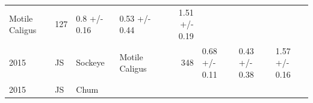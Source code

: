\documentclass[fleqn,10pt]{wlpeerj} %
\begin{document}
\begin{longtable}[]{@{}llllrlll@{}}
\begin{minipage}[t]{0.11\columnwidth}
Motile Caligus\strut
\end{minipage} & \begin{minipage}[t]{0.04\columnwidth}\raggedleft\strut
127\strut
\end{minipage} & \begin{minipage}[t]{0.14\columnwidth}\raggedright\strut
0.8 +/- 0.16\strut
\end{minipage} & \begin{minipage}[t]{0.14\columnwidth}\raggedright\strut
0.53 +/- 0.44\strut
\end{minipage} & \begin{minipage}[t]{0.14\columnwidth}\raggedright\strut
1.51 +/- 0.19\strut
\end{minipage}\tabularnewline
\begin{minipage}[t]{0.09\columnwidth}\raggedright\strut
2015\strut
\end{minipage} & \begin{minipage}[t]{0.06\columnwidth}\raggedright\strut
JS\strut
\end{minipage} & \begin{minipage}[t]{0.06\columnwidth}\raggedright\strut
Sockeye\strut
\end{minipage} & \begin{minipage}[t]{0.11\columnwidth}\raggedright\strut
Motile Caligus\strut
\end{minipage} & \begin{minipage}[t]{0.04\columnwidth}\raggedleft\strut
348\strut
\end{minipage} & \begin{minipage}[t]{0.14\columnwidth}\raggedright\strut
0.68 +/- 0.11\strut
\end{minipage} & \begin{minipage}[t]{0.14\columnwidth}\raggedright\strut
0.43 +/- 0.38\strut
\end{minipage} & \begin{minipage}[t]{0.14\columnwidth}\raggedright\strut
1.57 +/- 0.16\strut
\end{minipage}\tabularnewline
\begin{minipage}[t]{0.09\columnwidth}\raggedright\strut
2015\strut
\end{minipage} & \begin{minipage}[t]{0.06\columnwidth}\raggedright\strut
JS\strut
\end{minipage} & \begin{minipage}[t]{0.06\columnwidth}\raggedright\strut
Chum\strut
\end{minipage} & \begin{minipage}[t]{0.11\columnwidth}\raggedright\strut

\end{minipage}
\end{longtable}
\end{document}
